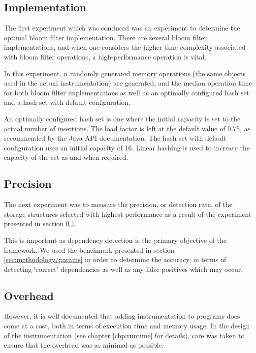 	\subsection{Implementation} \label{sec:methodology/experiments/implementation}
	The first experiment which was conduced was an experiment to determine the optimal bloom filter implementation. There are several bloom filter implementations, and when one considers the higher time complexity associated with bloom filter operations, a high-performance operation is vital.
	
	In this experiment, $n$ randomly generated memory operations (the same objects used in the actual instrumentation) are generated, and the median operation time for both bloom filter implementations as well as an optimally configured hash set and a hash set with default configuration.
	
	An optimally configured hash set is one where the initial capacity is set to the actual number of insertions. The load factor is left at the default value of 0.75, as recommended by the Java API documentation. The hash set with default configuration uses an initial capacity of 16. Linear hashing is used to increase the capacity of the set as-and-when required.
	
	\subsection{Precision} \label{sec:methodology/experiments/precision}
	The next experiment was to measure the precision, or detection rate, of the storage structures selected with highest performance as a result of the experiment presented in section \ref{sec:methodology/experiments/implementation}.
	
	This is important as dependency detection is the primary objective of the framework. We used the benchmark presented in section \ref{sec:methodology/params} in order to determine the accuracy, in terms of detecting `correct' dependencies as well as any false positives which may occur.
	
	\subsection{Overhead} \label{sec:methodology/experiments/overhead}
	However, it is well documented that adding instrumentation to programs does come at a cost, both in terms of execution time and memory usage. In the design of the instrumentation (see chapter \ref{chp:runtime} for details), care was taken to ensure that the overhead was as minimal as possible.
	
